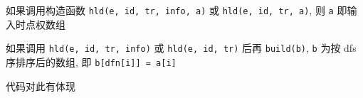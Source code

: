 如果调用构造函数 \verb|hld(e, id, tr, info, a)| 或 \verb|hld(e, id, tr, a)|, 则 \verb|a| 即输入时点权数组

如果调用 \verb|hld(e, id, tr, info)| 或 \verb|hld(e, id, tr)| 后再 \verb|build(b)|, \verb|b| 为按 dfs 序排序后的数组, 即 \verb|b[dfn[i]] = a[i]|

代码对此有体现